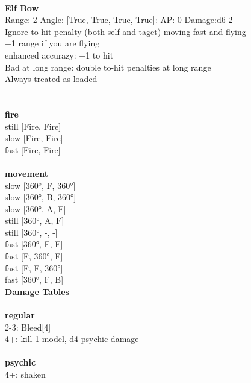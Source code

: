 \ \\
{\bf Elf Bow } \\



Range: 2  Angle: [True, True, True, True]: AP: 0 Damage:d6-2 \\
Ignore to-hit penalty (both self and taget) moving fast and flying\\ 
+1 range if you are flying\\ 
enhanced accurazy: +1 to hit\\ 
Bad at long range: double to-hit penalties at long range\\ 
Always treated as loaded\\ 




 
\ \\



\ \\ {\bf fire } \\
still [Fire, Fire] \\
slow [Fire, Fire] \\
fast [Fire, Fire] \\
\ \\ {\bf movement } \\
slow [360°, F, 360°] \\
slow [360°, B, 360°] \\
slow [360°, A, F] \\
still [360°, A, F] \\
still [360°, -, -] \\
fast [360°, F, F] \\
fast [F, 360°, F] \\
fast [F, F, 360°] \\
fast [360°, F, B] \\


{\bf Damage Tables} \\
\ \\ {\bf regular } \\
2-3: Bleed[4] \\
4+: kill 1 model, d4 psychic damage \\
\ \\ {\bf psychic } \\
4+: shaken \\











